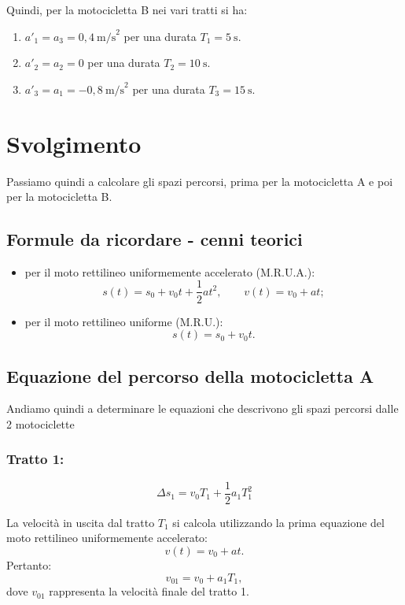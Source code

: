 \documentclass[a4paper,11pt]{article}
\begin{document}
Quindi, per la motocicletta B nei vari tratti si ha:
\begin{enumerate}
\item $a'_1 = a_3 = 0{,}4\ \text{m/s}^2$ per una durata $T_1 = 5\ \text{s}$.

\item $a'_2 = a_2 = 0$ per una durata $T_2 = 10\ \text{s}$.

\item $a'_3 = a_1 = -0{,}8\ \text{m/s}^2$ per una durata $T_3 = 15\ \text{s}$.
\end{enumerate}


\section{Svolgimento}
Passiamo quindi a calcolare gli spazi percorsi, prima per la motocicletta A e poi per la motocicletta B.
\\
\subsection{Formule da ricordare - cenni teorici}
\begin{itemize}
\item per il moto rettilineo uniformemente accelerato (M.R.U.A.):
\[
s(t) = s_0 + v_0 t + \frac{1}{2} a t^2,
\qquad
v(t) = v_0 + a t;
\]

\item per il moto rettilineo uniforme (M.R.U.):
\[
s(t) = s_0 + v_0 t.
\]
\end{itemize}
\medskip
{} 

\subsection{Equazione del percorso della motocicletta A}
Andiamo quindi a determinare le equazioni che descrivono gli spazi percorsi dalle 2 motociclette
\subsubsection{Tratto 1:}
\[
\Delta s_1 = v_0 T_1 + \frac{1}{2} a_1 T_1^2
\]

La velocità in uscita dal tratto $T_1$ si calcola utilizzando la prima equazione del moto
rettilineo uniformemente accelerato:
\[
v(t) = v_0 + a t.
\]
Pertanto:
\[
v_{01} = v_0 + a_1 T_1,
\]
dove $v_{01}$ rappresenta la velocità finale del tratto 1.
\end{document}
